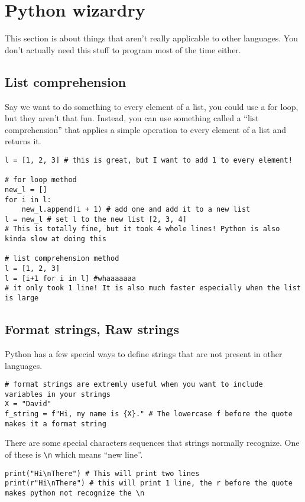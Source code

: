 \documentclass{assignments}
\begin{document}
\section*{Python wizardry}
\label{sec:org58688cb}
This section is about things that aren't really applicable to other languages.
You don't actually need this stuff to program most of the time either.
\subsection*{List comprehension}
\label{sec:orge5ff53f}
Say we want to do something to every element of a list, you could use a for
loop, but they aren't that fun. Instead, you
can use something called a ``list comprehension'' that applies a simple operation
to every element of a list and returns it.
\begin{verbatim}
l = [1, 2, 3] # this is great, but I want to add 1 to every element!

# for loop method
new_l = []
for i in l:
    new_l.append(i + 1) # add one and add it to a new list
l = new_l # set l to the new list [2, 3, 4]
# This is totally fine, but it took 4 whole lines! Python is also kinda slow at doing this

# list comprehension method
l = [1, 2, 3]
l = [i+1 for i in l] #whaaaaaaa
# it only took 1 line! It is also much faster especially when the list is large

\end{verbatim}
\subsection*{Format strings, Raw strings}
\label{sec:orga2fa712}
Python has a few special ways to define strings that are not present in other
languages.
\begin{verbatim}
# format strings are extremly useful when you want to include variables in your strings
X = "David"
f_string = f"Hi, my name is {X}." # The lowercase f before the quote makes it a format string
\end{verbatim}

There are some special characters sequences that strings normally recognize. One of these is \texttt{\textbackslash{}n}
which means ``new line''.
\begin{verbatim}
print("Hi\nThere") # This will print two lines
print(r"Hi\nThere") # this will print 1 line, the r before the quote makes python not recognize the \n
\end{verbatim}
\end{document}
